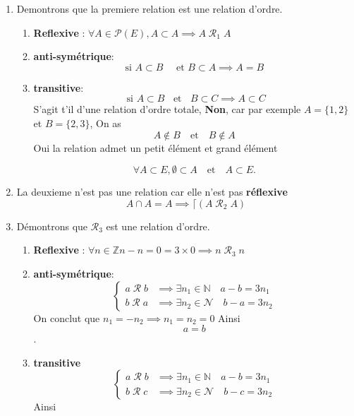 \documentclass{report}
\begin{document}
\begin{myproof}
  \begin{enumerate}
    \item Demontrons que la premiere relation est une relation d'ordre.
      \begin{enumerate}
        \item \textbf{Reflexive} : $ \forall A \in \mathcal{P}(E), A \subset A
          \implies A\;\mathcal{R}_1\;A$
        \item \textbf{anti-symétrique}: \\
          $$
          \text{si } A \subset B \quad \text{ et } B \subset A \implies A = B
          $$
        \item \textbf{transitive}:
          $$
          \text{ si } A\subset B \;\;\text{ et }\;\; B \subset C \implies A
          \subset C
          $$
          S'agit t'il d'une relation d'ordre totale, \textbf{Non}, car par
          exemple $A=\{1, 2\} $ et $B = \{2, 3\}$, On as 
          $$
          A\not \in B \quad \text{et}\quad B \not\in A
          $$
          Oui la relation admet un petit élément et grand élément

          $$
          \forall A \subset E, \emptyset \subset A\quad \text{et}\quad A \subset
          E.
          $$
      \end{enumerate}
    \item La deuxieme n'est pas une relation car elle n'est pas
      \textbf{réflexive}
      $$
      A \cap A = A \implies \lceil(A \;\mathcal{R}_2\; A)
      $$

\item Démontrons que $\mathcal{R}_3$ est une relation d'ordre.

  \begin{enumerate}
    \item \textbf{Reflexive} : $\forall n \in \mathbb{Z} n - n = 0 = 3\times0
      \implies n \;\mathcal{R}_3\; n$
    \item \textbf{anti-symétrique}: \\
      $$
      \begin{cases}
        a\;\mathcal{R}\;b & \implies \exists n_1 \in \mathbb{N} \quad a - b =
        3n_1\\
        b\;\mathcal{R}\;a &\implies \exists n_2 \in \mathcal{N}\quad b - a =
        3n_2
      \end{cases}
      $$
      On conclut que $n_1 = -n_2 \implies n_1 = n_2 = 0$  Ainsi $$ a= b$$.
    \item  \textbf{transitive}\\
      $$
      \begin{cases}
        a\;\mathcal{R}\;b & \implies \exists n_1 \in \mathbb{N} \quad a - b =
        3n_1\\
        b\;\mathcal{R}\;c &\implies \exists n_2 \in \mathcal{N}\quad b - c =
        3n_2
      \end{cases}
      $$
      Ainsi


\end{enumerate}
\end{enumerate}
\end{myproof}
\end{document}

